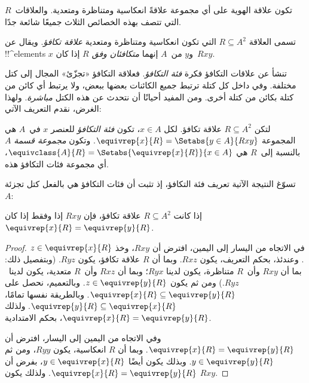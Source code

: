 \documentclass[../../../include/open-logic-section]{subfiles}
\begin{document}


تكون علاقة الهوية على أي مجموعة علاقةً انعكاسية ومتناظرة ومتعدية. والعلاقات~$R$ التي
تتصف بهذه الخصائص الثلاث جميعًا شائعة جدًا.

\begin{defn}
تسمى العلاقة $R \subseteq A^2$ التي تكون انعكاسية ومتناظرة ومتعدية
\emph{علاقة تكافؤ}. ويقال عن !!^{element}s $x$ و$y$ من~$A$ إنهما
\emph{متكافئان وفق $R$} إذا كان~$Rxy$.
\end{defn}

تنشأ عن علاقات التكافؤ فكرة \emph{فئة التكافؤ}. فعلاقة التكافؤ «تجزّئ»
المجال إلى كتل مختلفة. وفي داخل كل كتلة ترتبط جميع الكائنات بعضها ببعض،
ولا يرتبط أي كائن من كتلة بكائن من كتلة أخرى. ومن المفيد أحيانًا أن نتحدث
عن هذه الكتل \emph{مباشرة}. ولهذا الغرض، نقدم التعريف الآتي:

\begin{defn}
لتكن $R \subseteq A^2$ علاقة تكافؤ. لكل $x \in A$، تكون \emph{فئة
التكافؤ} للعنصر $x$ في~$A$ هي المجموعة $\equivrep{x}{R}
= \Setabs{y \in A}{Rxy}$. وتكون \emph{مجموعة قسمة} $A$ بالنسبة إلى~$R$ هي
$\equivclass{A}{R} = \Setabs{\equivrep{x}{R}}{x \in A}$، أي مجموعة فئات
التكافؤ هذه.
\end{defn}

تسوّغ النتيجة الآتية تعريف فئة التكافؤ، إذ تثبت أن فئات التكافؤ هي بالفعل
كتل تجزئة~$A$:

\begin{prop}
إذا كانت $R \subseteq A^2$ علاقة تكافؤ، فإن $Rxy$ إذا وفقط إذا كان
$\equivrep{x}{R} = \equivrep{y}{R}$.
\end{prop}

\begin{proof}
في الاتجاه من اليسار إلى اليمين، افترض أن $Rxy$، وخذ $z \in
\equivrep{x}{R}$. وعندئذ، بحكم التعريف، يكون $Rxz$. وبما أن $R$ علاقة
تكافؤ، يكون $Ryz$. (وبتفصيل ذلك: بما أن $Rxy$ وأن~$R$ متناظرة، يكون لدينا
$Ryx$؛ وبما أن $Rxz$ وأن~$R$ متعدية، يكون لدينا~$Ryz$.) ومن ثم يكون
$z \in \equivrep{y}{R}$. وبالتعميم، نحصل على
$\equivrep{x}{R} \subseteq \equivrep{y}{R}$. وبالطريقة نفسها تمامًا،
$\equivrep{y}{R} \subseteq \equivrep{x}{R}$. ولذلك
$\equivrep{x}{R} = \equivrep{y}{R}$، بحكم الامتدادية.

وفي الاتجاه من اليمين إلى اليسار، افترض أن $\equivrep{x}{R} =
\equivrep{y}{R}$. وبما أن $R$ انعكاسية، يكون $Ryy$، ومن ثم
$y \in \equivrep{y}{R}$. وبذلك يكون أيضًا $y \in \equivrep{x}{R}$،
بفرض أن $\equivrep{x}{R} = \equivrep{y}{R}$. ولذلك يكون $Rxy$.
\end{proof}
\end{document}
